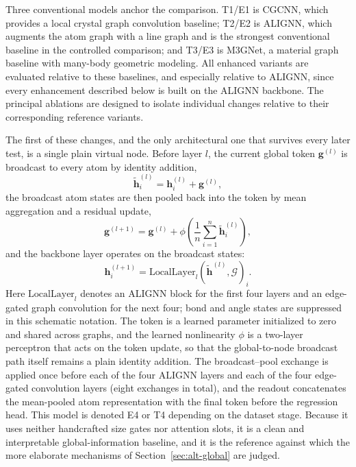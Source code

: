 \documentclass[a4paper,11pt]{article}
\begin{document}
Three conventional models anchor the comparison. T1/E1 is CGCNN, which provides a local crystal graph convolution baseline; T2/E2 is ALIGNN, which augments the atom graph with a line graph and is the strongest conventional baseline in the controlled comparison; and T3/E3 is M3GNet, a material graph baseline with many-body geometric modeling. All enhanced variants are evaluated relative to these baselines, and especially relative to ALIGNN, since every enhancement described below is built on the ALIGNN backbone. The principal ablations are designed to isolate individual changes relative to their corresponding reference variants.

The first of these changes, and the only architectural one that survives every later test, is a single plain virtual node. Before layer \(l\), the current global token \(\mathbf{g}^{(l)}\) is broadcast to every atom by identity addition,
\begin{equation}
\tilde{\mathbf{h}}^{(l)}_i = \mathbf{h}^{(l)}_i + \mathbf{g}^{(l)},
\end{equation}
the broadcast atom states are then pooled back into the token by mean aggregation and a residual update,
\begin{equation}
\mathbf{g}^{(l+1)} = \mathbf{g}^{(l)}
 + \phi\!\left(\frac{1}{n}\sum_{i=1}^{n}\tilde{\mathbf{h}}^{(l)}_i\right),
\end{equation}
and the backbone layer operates on the broadcast states:
\begin{equation}
\mathbf{h}^{(l+1)}_i =
\mathrm{LocalLayer}_{l}(\tilde{\mathbf{h}}^{(l)},\mathcal{G})_i.
\end{equation}
Here \(\mathrm{LocalLayer}_{l}\) denotes an ALIGNN block for the first four layers and an edge-gated graph convolution for the next four; bond and angle states are suppressed in this schematic notation. The token is a learned parameter initialized to zero and shared across graphs, and the learned nonlinearity \(\phi\) is a two-layer perceptron that acts on the token update, so that the global-to-node broadcast path itself remains a plain identity addition. The broadcast--pool exchange is applied once before each of the four ALIGNN layers and each of the four edge-gated convolution layers (eight exchanges in total), and the readout concatenates the mean-pooled atom representation with the final token before the regression head. This model is denoted E4 or T4 depending on the dataset stage. Because it uses neither handcrafted size gates nor attention slots, it is a clean and interpretable global-information baseline, and it is the reference against which the more elaborate mechanisms of Section~\ref{sec:alt-global} are judged.
\end{document}
